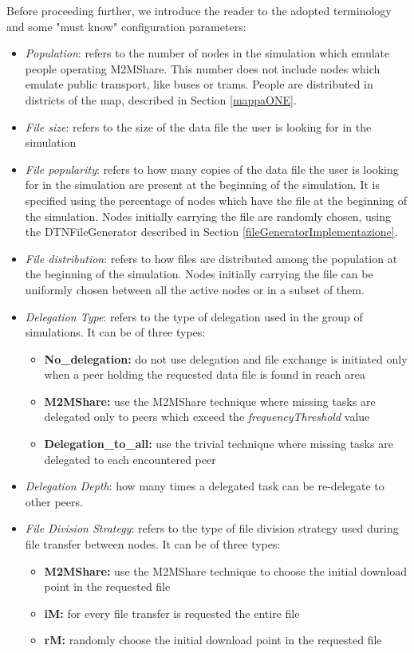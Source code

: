 Before proceeding further, we introduce the reader to the adopted terminology and some "must know" configuration parameters:
\begin{itemize}
\item \textit{Population}: refers to the number of nodes in the simulation which emulate people operating M2MShare. This number does not include nodes which emulate public transport, like buses or trams. People are distributed in districts of the map, described in Section \ref{mappaONE}.

\item \textit{File size}: refers to the size of the data file the user is looking for in the simulation 

\item \textit{File popularity}: refers to how many copies of the data file the user is looking for in the simulation are present at the beginning of the simulation. It is specified using the percentage of nodes which have the file at the beginning of the simulation. Nodes initially carrying the file are randomly chosen, using the DTNFileGenerator described in Section \ref{fileGeneratorImplementazione}.

\item \textit{File distribution}: refers to how files are distributed among the population at the beginning of the simulation. Nodes initially carrying the file can be uniformly chosen between all the active nodes or in a subset of them.

\item \textit{Delegation Type}: refers to the type of delegation used in the group of simulations. It can be of three types:
\begin{itemize}
\item \textbf{No\_delegation:} do not use delegation and file exchange is initiated only when a peer holding the requested data file is found in reach area 
\item \textbf{M2MShare:} use the M2MShare technique where missing tasks are delegated only to peers which exceed the \textit{frequencyThreshold} value
\item \textbf{Delegation\_to\_all:} use the trivial technique where missing tasks are delegated to each encountered peer
\end{itemize}

\item \textit{Delegation Depth}: how many times a delegated task can be re-delegate to other peers.

\item \textit{File Division Strategy}: refers to the type of file division strategy used during file transfer between nodes. It can be of three types:
\begin{itemize}
\item \textbf{M2MShare:} use the M2MShare technique to choose the initial download point in the requested file
\item \textbf{iM:} for every file transfer is requested the entire file
\item \textbf{rM:} randomly choose the initial download point in the requested file
\end{itemize}


\end{itemize}
